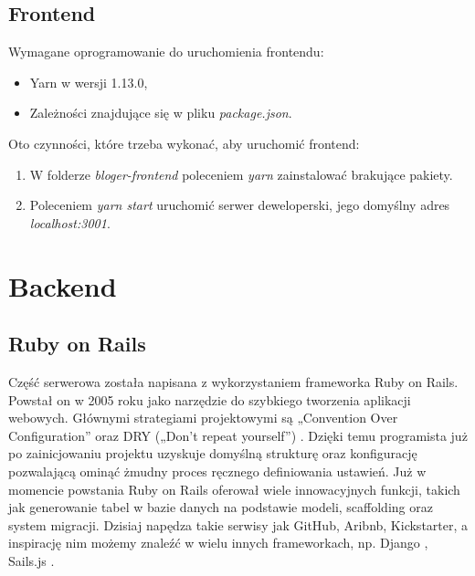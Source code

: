 \documentclass[declaration,shortabstract,polish,inz]{iithesis}
\begin{document}
\subsection{Frontend}
Wymagane oprogramowanie do uruchomienia frontendu:
    \begin{itemize}
        \item Yarn \cite{yarn} w wersji 1.13.0,
        \item Zależności znajdujące się w pliku \textit{package.json}.
    \end{itemize}

Oto czynności, które trzeba wykonać, aby uruchomić frontend:
\begin{enumerate}
    \item W folderze \textit{bloger-frontend} poleceniem \textit{yarn} zainstalować brakujące pakiety.
    \item Poleceniem \textit{yarn start} uruchomić serwer deweloperski, jego domyślny adres \textit{localhost:3001}.
\end{enumerate}

\section{Backend}
\subsection{Ruby on Rails}
Część serwerowa została napisana z wykorzystaniem frameworka Ruby on Rails. Powstał on w 2005 roku \cite{rorwiki} jako narzędzie do szybkiego tworzenia aplikacji webowych. Głównymi strategiami projektowymi są „Convention Over Configuration” \cite{coc} oraz DRY („Don’t repeat yourself”) \cite{dry}. Dzięki temu programista już po zainicjowaniu projektu uzyskuje domyślną strukturę oraz konfigurację pozwalającą ominąć żmudny proces ręcznego definiowania ustawień. Już w momencie powstania Ruby on Rails oferował wiele innowacyjnych funkcji, takich jak generowanie tabel w bazie danych na podstawie modeli, scaffolding oraz system migracji. Dzisiaj napędza takie serwisy jak GitHub, Aribnb, Kickstarter, a inspirację nim możemy znaleźć w wielu innych frameworkach, np. Django \cite{django}, Sails.js \cite{sails}.
\end{document}

